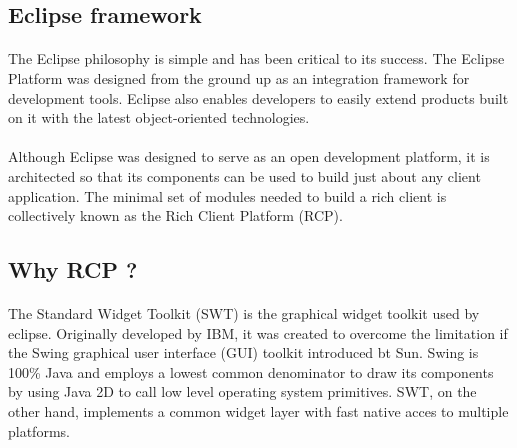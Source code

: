 \documentclass[12pt,a4paper]{report}
\begin{document}
\subsection{Eclipse framework}

\paragraph{}
The Eclipse philosophy is simple and has been critical to its success. The Eclipse Platform
was designed from the ground up as an integration framework for development tools. Eclipse
also enables developers to easily extend products built on it with the latest object-oriented
technologies.
\paragraph{}
Although Eclipse was designed to serve as an open development platform, it is architected
so that its components can be used to build just about any client application. The minimal set
of modules needed to build a rich client is collectively known as the Rich Client Platform (RCP).

\subsection{Why RCP ?}
\paragraph{}
The Standard Widget Toolkit (SWT) is the graphical widget toolkit used by eclipse. Originally developed by
IBM, it was created to overcome the limitation if the Swing graphical user interface (GUI) toolkit introduced
bt Sun. Swing is 100\% Java and employs a lowest common denominator to draw its components by using Java 2D to call low level operating system primitives. SWT, on the other hand, implements a common widget layer with fast native acces to multiple platforms.
\end{document}
